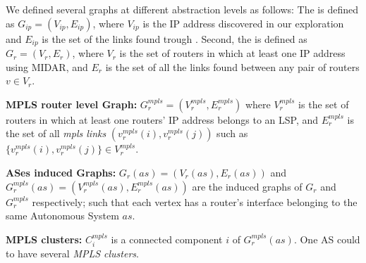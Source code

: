 We defined several graphs at different abstraction levels as follows:
The  is defined as $G_{ip}=(V_{ip}, E_{ip})$, where $V_{ip}$
is the IP address discovered in our exploration and $E_{ip}$ is the set of the
links found trough \traceroute.   Second, the  is
defined as $G_{r}=(V_{r}, E_{r})$, where $V_{r}$ is the set of routers in which
at least one IP address using MIDAR, and $E_{r}$ is the set of all the links
found between any pair of routers $v\in V_{r}$.


\textbf{MPLS router level Graph:} $G^{mpls}_{r}=(V^{mpls}_{r}, E^{mpls}_{r})$
where  $V^{mpls}_{r}$ is the set of routers in which at least one routers' IP
address belongs to an LSP, and  $E^{mpls}_{r}$ is the set of all \textit{mpls
links} $(v^{mpls}_{r}(i), v^{mpls}_{r}(j))$ such as
$\{{v^{mpls}_{r}(i)},{v^{mpls}_{r}(j)} \}\in V^{mpls}_{r}$.   

\textbf{ASes induced Graphs:} $G_{r}(as)=(V_{r}(as), E_{r}(as))$ and
$G^{mpls}_{r}(as)=(V^{mpls}_{r}(as), E^{mpls}_{r}(as))$ are the induced graphs
of $G_{r}$ and $G^{mpls}_{r}$ respectively; such that each vertex has a router's
interface belonging to the same Autonomous System $as$.

\textbf{MPLS clusters:} $C^{mpls}_{i}$ is a connected component $i$ of
$G^{mpls}_{r}(as)$. One AS could to have several \textit{MPLS clusters}.

